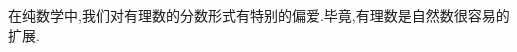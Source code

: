\documentclass[main.tex]{subfiles}
\begin{document}
在纯数学中,我们对有理数的分数形式有特别的偏爱.毕竟,有理数是自然数很容易的扩展.
\end{document}

